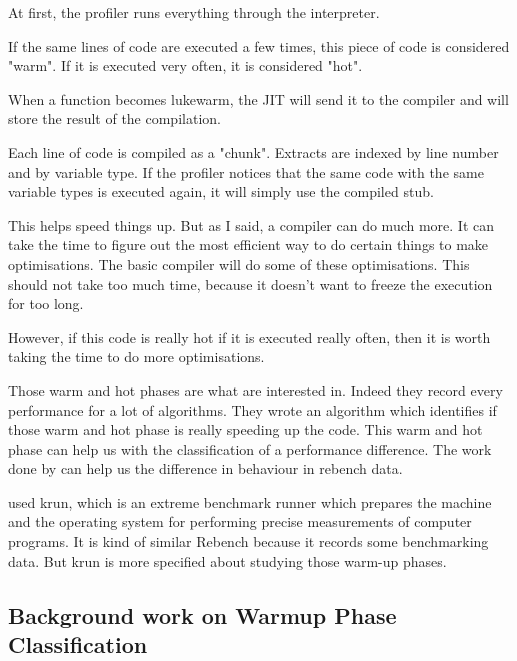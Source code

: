 \documentclass{article}
\begin{document}
At first, the profiler runs everything through the interpreter.

If the same lines of code are executed a few times, this piece of code is considered "warm". If it is executed very often, it is considered "hot".

When a function becomes lukewarm, the JIT will send it to the compiler and will store the result of the compilation.

Each line of code is compiled as a "chunk". Extracts are indexed by line number and by variable type. If the profiler notices that the same code with the same variable types is executed again, it will simply use the compiled stub.

This helps speed things up. But as I said, a compiler can do much more. It can take the time to figure out the most efficient way to do certain things to make optimisations. The basic compiler will do some of these optimisations. This should not take too much time, because it doesn't want to freeze the execution for too long.

However, if this code is really hot if it is executed really often, then it is worth taking the time to do more optimisations.

Those warm and hot phases are what \citep{barrett2017virtual} are interested in. Indeed they record every performance for a lot of algorithms. They wrote an algorithm which identifies if those warm and hot phase is really speeding up the code. This warm and hot phase can help us with the classification of a performance difference. The work done by \citep{barrett2017virtual} can help us the difference in behaviour in rebench data.

\citep{barrett2017virtual} used krun, which is an extreme benchmark runner which prepares the machine and the operating system for performing precise measurements of computer programs. It is kind of similar Rebench because it records some benchmarking data. But krun is more specified about studying those warm-up phases.

\subsection{Background work on Warmup Phase Classification}
\end{document}
